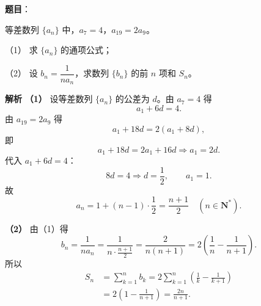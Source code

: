 \begin{answer}

\textbf{题目}：

等差数列 $\{a_n\}$ 中，$a_7=4$，$a_{19}=2a_9$。

（1） 求 $\{a_n\}$ 的通项公式；

（2） 设 $b_n=\dfrac1{na_n}$，求数列 $\{b_n\}$ 的前 $n$ 项和 $S_n$。

\textbf{解析}
\textbf{（1）} 设等差数列 $\{a_n\}$ 的公差为 $d$。由 $a_7=4$ 得
\nopagebreak[4]
\[a_1+6d=4.\]
由 $a_{19}=2a_9$ 得
\nopagebreak[4]
\[a_1+18d=2(a_1+8d),\]
即
\nopagebreak[4]
\[a_1+18d=2a_1+16d\Longrightarrow a_1=2d.\]
代入 $a_1+6d=4$：
\nopagebreak[4]
\[8d=4\Longrightarrow d=\frac12,\qquad a_1=1.\]
故
\nopagebreak[4]
\[a_n=1+(n-1)\cdot\frac12=\frac{n+1}2\quad(n\in\mathbf N^*).\]

\textbf{（2）} 由（1）得
\nopagebreak[4]
\[b_n=\frac1{na_n}
=\frac1{n\cdot\frac{n+1}2}
=\frac2{n(n+1)}
=2\left(\frac1n-\frac1{n+1}\right).\]
所以
\nopagebreak[4]
\[\begin{aligned}
S_n&=\sum_{k=1}^{n}b_k
=2\sum_{k=1}^{n}\left(\frac1k-\frac1{k+1}\right)\\
&=2\left(1-\frac1{n+1}\right)
=\frac{2n}{n+1}.
\end{aligned}\]



\end{answer}
